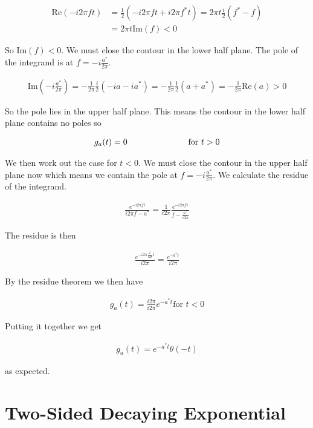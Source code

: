 \documentclass[12pt]{article}
\begin{document}
\begin{align}
\text{Re}(-i2\pi f t) &= \frac{1}{2}\left(-i 2 \pi f t + i 2 \pi f^* t \right) = 2 \pi t \frac{i}{2}(f^* - f)\\
&= 2\pi t \text{Im}(f)  < 0 
\end{align}

So $\text{Im}(f)<0$. We must close the contour in the lower half plane. The pole of the integrand is at $ f= -i \frac{a^*}{2\pi}$.

\begin{align}
\text{Im}\left(-i\frac{a^*}{2\pi}\right) = -\frac{1}{2\pi} \frac{i}{2}\left(-ia - i a^* \right) = -\frac{1}{2\pi}\frac{1}{2}\left(a + a^*\right) = -\frac{1}{2\pi} \text{Re}(a) > 0
\end{align}

So the pole lies in the upper half plane. This means the contour in the lower half plane contains no poles so 

\begin{align}
g_a(t) = 0 \hspace{1 in} \text{for } t>0
\end{align}

We then work out the case for $t<0$. We must close the contour in the upper half plane now which means we contain the pole at $f = -i \frac{a^*}{2\pi}$. We calculate the residue of the integrand.

\begin{align}
\frac{e^{-i 2\pi f t}}{i 2\pi f - a^*} = \frac{1}{i2\pi} \frac{e^{-i2 \pi ft}}{f - \frac{a^*}{i2\pi}}
\end{align}

The residue is then

\begin{align}
\frac{e^{-i 2 \pi \frac{a^*}{i 2 \pi} t}}{i 2 \pi} = \frac{e^{-a^*t}}{i 2 \pi}
\end{align}


By the residue theorem we then have

\begin{align}
g_a(t) = \frac{i 2 \pi}{i 2 \pi} e^{-a^* t} \text{for } t<0
\end{align}

Putting it together we get

\begin{align}
g_a(t) = e^{-a^*t}\theta(-t)
\end{align}

as expected.

\section{Two-Sided Decaying Exponential}
\end{document}
